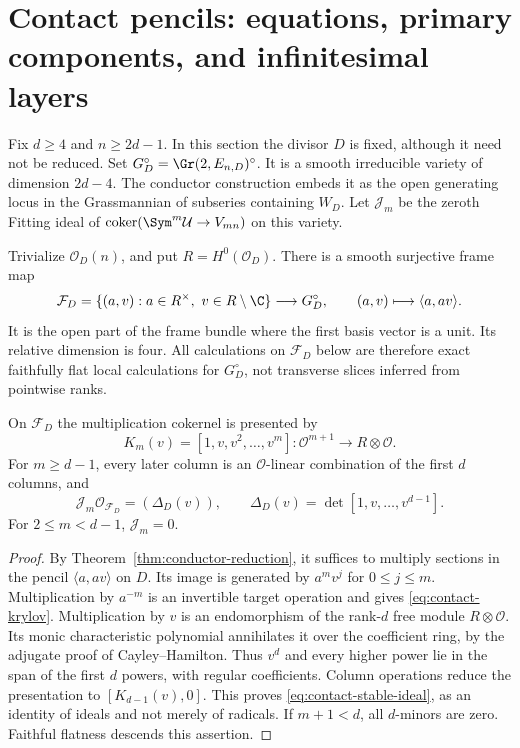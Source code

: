 \section{Contact pencils: equations, primary components, and infinitesimal layers}
\label{sec:contact-primary-structure}
Fix $d\ge4$ and $n\ge2d-1$. In this section the divisor $D$ is
fixed, although it need not be reduced. Set
$G_D^\circ=\Gr(2,E_{n,D})^\circ$. It is a smooth irreducible variety
of dimension $2d-4$. The conductor construction embeds it as the
open generating locus in the Grassmannian of subseries containing
$W_D$. Let $\mathcal J_m$ be the zeroth Fitting ideal of
$\operatorname{coker}(\Sym^m\mathcal U\to V_{mn})$ on this variety.

Trivialize $\mathcal O_D(n)$, and put $R=H^0(\mathcal O_D)$.
There is a smooth surjective frame map
\begin{equation}\label{eq:contact-frame}
 \mathcal F_D=\{(a,v):a\in R^\times,\ v\in R\setminus\C\}
 \longrightarrow G_D^\circ,\qquad (a,v)\longmapsto\langle a,av\rangle.
\end{equation}
It is the open part of the frame bundle where the first basis vector
is a unit. Its relative dimension is four. All calculations on
$\mathcal F_D$ below are therefore exact faithfully flat local
calculations for $G_D^\circ$, not transverse slices inferred from
pointwise ranks.

\begin{lemma}\label{lem:contact-power-basis}
On $\mathcal F_D$ the multiplication cokernel is presented by
\begin{equation}\label{eq:contact-krylov}
 K_m(v)=[1,v,v^2,\ldots,v^m]:\mathcal O^{m+1}
                              \longrightarrow R\otimes\mathcal O.
\end{equation}
For $m\ge d-1$, every later column is an $\mathcal O$-linear
combination of the first $d$ columns, and
\begin{equation}\label{eq:contact-stable-ideal}
 \mathcal J_m\mathcal O_{\mathcal F_D}=(\Delta_D(v)),\qquad
 \Delta_D(v)=\det[1,v,\ldots,v^{d-1}].
\end{equation}
For $2\le m<d-1$, $\mathcal J_m=0$.
\end{lemma}
\begin{proof}
By Theorem~\ref{thm:conductor-reduction}, it suffices to multiply
sections in the pencil $\langle a,av\rangle$ on $D$. Its image
is generated by $a^m v^j$ for $0\le j\le m$. Multiplication by
$a^{-m}$ is an invertible target operation and gives
\eqref{eq:contact-krylov}. Multiplication by $v$ is an endomorphism
of the rank-$d$ free module $R\otimes\mathcal O$. Its monic
characteristic polynomial annihilates it over the coefficient ring,
by the adjugate proof of Cayley--Hamilton. Thus $v^d$ and every
higher power lie in the span of the first $d$ powers, with regular
coefficients. Column operations reduce the presentation to
$[K_{d-1}(v),0]$. This proves \eqref{eq:contact-stable-ideal}, as an
identity of ideals and not merely of radicals. If $m+1<d$, all
$d$-minors are zero. Faithful flatness descends this assertion.
\end{proof}

